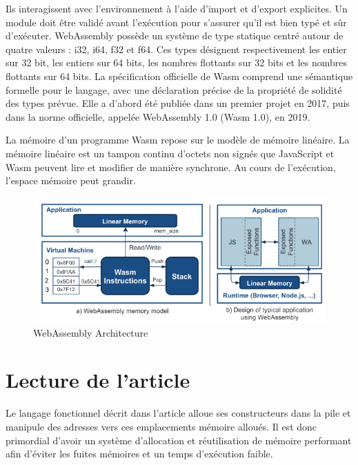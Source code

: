 \documentclass{rapportECL}
\begin{document}
Ils interagissent avec l’environnement à l’aide d’import et d’export explicites. 
Un module doit être validé avant l’exécution pour s’assurer qu’il est bien typé et sûr d’exécuter. 
WebAssembly possède un système de type statique centré autour de quatre valeurs :  i32, i64, f32 et f64. 
Ces types désignent respectivement les entier sur 32 bit, les entiers sur 64 bits, les nombres flottants sur 32 bits et les nombres 
flottants sur 64 bits.
La spécification officielle de Wasm comprend une sémantique formelle pour le langage, 
avec une déclaration précise de la propriété de solidité des types prévue. 
Elle a d'abord été publiée dans un premier projet en 2017, puis dans la norme officielle, appelée WebAssembly 1.0 (Wasm 1.0), en 2019.
\par La mémoire d’un programme Wasm repose sur le modèle de mémoire linéaire\cite{haas_bringing_2017}. 
La mémoire linéaire est un tampon continu d'octets non signés  que JavaScript et Wasm peuvent lire et modifier de manière synchrone. 
Au cours de l’exécution, l’espace mémoire peut grandir. 

\begin{figure}[ht]
	\centering
	\includegraphics[scale=0.65]{logos/model_memory_wasm.png}	
	\caption{WebAssembly Architecture \cite{noauthor_wasmati_nodate}}
\end{figure}
\FloatBarrier 



\section{Lecture de l'article} \label{section:article}
Le langage fonctionnel décrit dans l'article\cite{ullrich_counting_2020} alloue ses constructeurs dans la pile et manipule des 
adresses vers ces emplacements mémoire alloués. Il est donc primordial d'avoir un système d'allocation et réutilisation de 
mémoire performant afin d'éviter les fuites mémoires et un temps d'exécution faible.
\end{document}
